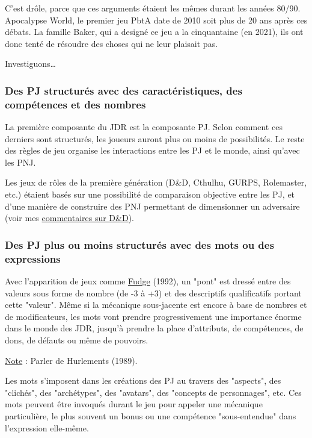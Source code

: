 \documentclass[a4paper, 11pt, twoside]{article}
\begin{document}
C'est drôle, parce que ces arguments étaient les mêmes durant les années 80/90. Apocalypse World, le premier jeu PbtA date de 2010 soit plus de 20 ans après ces débats. La famille Baker, qui a designé ce jeu a la cinquantaine (en 2021), ils ont donc tenté de résoudre des choses qui ne leur plaisait pas.

Investiguons\ldots{} 

\subsubsection{Des PJ structurés avec des caractéristiques, des compétences et des nombres}
\label{sec:org3375c49}

La première composante du JDR est la composante PJ. Selon comment ces derniers sont structurés, les joueurs auront plus ou moins de possibilités. Le reste des règles de jeu organise les interactions entre les PJ et le monde, ainsi qu'avec les PNJ.

Les jeux de rôles de la première génération (D\&D, Cthulhu, GURPS, Rolemaster, etc.) étaient basés sur une possibilité de comparaison objective entre les PJ, et d'une manière de construire des PNJ permettant de dimensionner un adversaire (voir mes \href{https://github.com/orey/DandD}{commentaires sur D\&D}).

\subsubsection{Des PJ plus ou moins structurés avec des mots ou des expressions}
\label{sec:orge2a532e}

Avec l'apparition de jeux comme \href{https://github.com/orey/jdr/tree/master/Fudge-fr}{Fudge} (1992), un "pont" est dressé entre des valeurs sous forme de nombre (de -3 à +3) et des descriptifs qualificatifs portant cette "valeur". Même si la mécanique sous-jacente est encore à base de nombres et de modificateurs, les mots vont prendre progressivement une importance énorme dans le monde des JDR, jusqu'à prendre la place d'attributs, de compétences, de dons, de défauts ou même de pouvoirs.

\uline{Note} : Parler de Hurlements (1989).

Les mots s'imposent dans les créations des PJ au travers des "aspects", des "clichés", des "archétypes", des "avatars", des "concepts de personnages", etc. Ces mots peuvent être invoqués durant le jeu pour appeler une mécanique particulière, le plus souvent un bonus ou une compétence "sous-entendue" dans l'expression elle-même.
\end{document}
